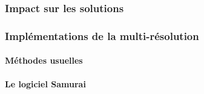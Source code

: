    \paragraph{}
    \paragraph{}
\subsubsection{Impact sur les solutions}
    \paragraph{}
    \paragraph{}
\subsubsection{Implémentations de la multi-résolution}
    \paragraph{Méthodes usuelles}
    \paragraph{Le logiciel Samurai}